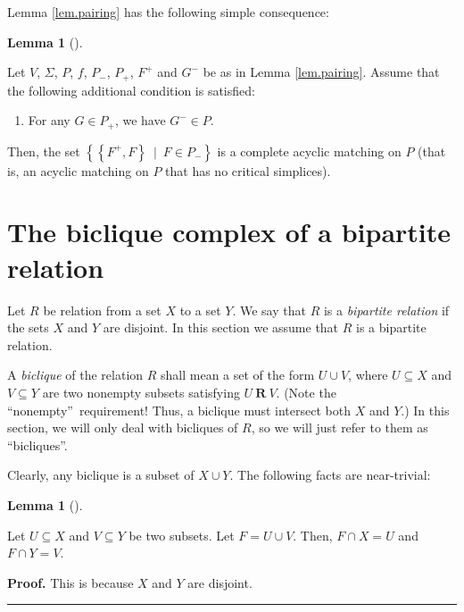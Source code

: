 \documentclass[numbers=enddot,12pt,final,onecolumn,notitlepage]{scrartcl}%
\theoremstyle{definition}
\newtheorem{lem}[theo]{Lemma}
\newenvironment{lemma}[1][]
{\begin{lem}[#1]\begin{leftbar}}
{\end{leftbar}\end{lem}}
\newenvironment{proof}[1][Proof]{\noindent\textbf{#1.} }{\ \rule{0.5em}{0.5em}}
\newenvironment{vershort}{}{}
\newenvironment{noncompile}{}{}
\begin{document}
\begin{noncompile}
Lemma \ref{lem.pairing} has the following simple consequence:

\begin{lemma}
\label{lem.pairing.complete}Let $V$, $\Sigma$, $P$, $f$, $P_{-}$, $P_{+}$,
$F^{+}$ and $G^{-}$ be as in Lemma \ref{lem.pairing}. Assume that the
following additional condition is satisfied:

\begin{enumerate}
\item[\textbf{(E)}] For any $G\in P_{+}$, we have $G^{-}\in P$.
\end{enumerate}

Then, the set $\left\{  \left\{  F^{+},F\right\}  \ \mid\ F\in P_{-}\right\}
$ is a complete acyclic matching on $P$ (that is, an acyclic matching on $P$
that has no critical simplices).
\end{lemma}
\end{noncompile}

\section{The biclique complex of a bipartite relation}

Let $R$ be relation from a set $X$ to a set $Y$. We say that $R$ is a
\emph{bipartite relation} if the sets $X$ and $Y$ are disjoint.
In this section we assume that $R$ is a bipartite relation.

A \emph{biclique} of the relation $R$ shall mean a set of the form $U\cup V$,
where $U\subseteq X$ and $V\subseteq Y$ are two nonempty subsets satisfying
$U\ \mathbf{R}\ V$.
(Note the \textquotedblleft nonempty\textquotedblright\ requirement! Thus, a
biclique must intersect both $X$ and $Y$.)
In this section, we will only deal with bicliques of $R$, so we will just
refer to them as ``bicliques''.

Clearly, any biclique is a subset of $X\cup Y$.
The following facts are near-trivial:

\begin{lemma}
\label{lem.XuY1}Let $U\subseteq X$ and $V\subseteq Y$ be two subsets. Let
$F=U\cup V$. Then, $F\cap X=U$ and $F\cap Y=V$.
\end{lemma}

\begin{vershort}


\begin{proof}
This is because $X$ and $Y$ are disjoint.
\end{proof}
\end{vershort}
\end{document}
